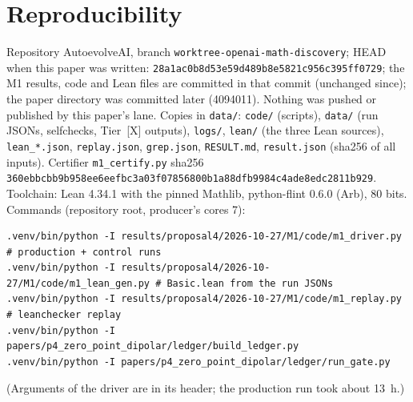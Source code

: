\documentclass[11pt]{article}
\newcommand{\tier}[1]{\textsf{[#1]}}
\newcommand{\tX}{\tier{X}}
\begin{document}
\section{Reproducibility}\label{sec:repro}
Repository AutoevolveAI, branch \texttt{worktree-openai-math-discovery}; HEAD when this paper was written: \texttt{28a1ac0b8d53e59d489b8e5821c956c395ff0729}; the M1 results, code and Lean files are committed in that commit (unchanged since); the paper directory was committed later (4094011). Nothing was pushed or published by this paper's lane. Copies in \texttt{data/}: \texttt{code/} (scripts), \texttt{data/} (run JSONs, selfchecks, Tier~\tX{} outputs), \texttt{logs/}, \texttt{lean/} (the three Lean sources), \texttt{lean\_*.json}, \texttt{replay.json}, \texttt{grep.json}, \texttt{RESULT.md}, \texttt{result.json} (sha256 of all inputs). Certifier \texttt{m1\_certify.py} sha256 \texttt{360ebbcbb9b958ee6eefbc3a03f07856800b1a88dfb9984c4ade8edc2811b929}. Toolchain: Lean 4.34.1 with the pinned Mathlib, python-flint 0.6.0 (Arb), 80 bits. Commands (repository root, producer's cores 7):
\begin{lstlisting}
.venv/bin/python -I results/proposal4/2026-10-27/M1/code/m1_driver.py   # production + control runs
.venv/bin/python -I results/proposal4/2026-10-27/M1/code/m1_lean_gen.py # Basic.lean from the run JSONs
.venv/bin/python -I results/proposal4/2026-10-27/M1/code/m1_replay.py   # leanchecker replay
.venv/bin/python -I papers/p4_zero_point_dipolar/ledger/build_ledger.py
.venv/bin/python -I papers/p4_zero_point_dipolar/ledger/run_gate.py
\end{lstlisting}
(Arguments of the driver are in its header; the production run took about 13~h.)
\end{document}
